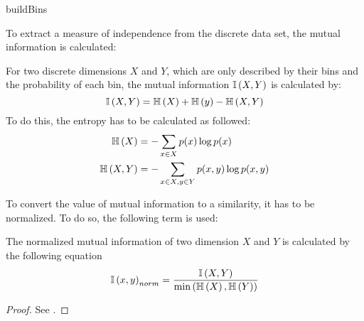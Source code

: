 \begin{algorithm}



	\caption{buildBins}
	\label{alg:buildBins}
\end{algorithm}

To extract a measure of independence from the discrete data set, the mutual information is calculated:

\begin{envdef}
	For two discrete dimensions $X$ and $Y$, which are only described by their bins and the probability of each bin, the mutual information $\mathbb{I}\left(X,Y\right)$ is calculated by:
	\begin{equation}
		\mathbb{I}\left(X,Y\right) = \mathbb{H}\left(X\right) + \mathbb{H}\left(y\right) - \mathbb{H}\left(X,Y\right)
	\end{equation}
	To do this, the entropy has to be calculated as followed:
	\begin{align}
		\mathbb{H}\left(X\right) &= - \sum_{x \in X} p(x) \log{p(x)}\\
		\mathbb{H}\left(X,Y\right) &= - \sum_{x \in X, y \in Y} p(x,y) \log{p(x,y)}
	\end{align}
\end{envdef}

To convert the value of mutual information to a similarity, it has to be normalized. To do so, the following term is used:

\begin{envtheo}
	The normalized mutual information of two dimension $X$ and $Y$ is calculated by the following equation
	\begin{equation}
		\mathbb{I}\left(x,y\right)_{norm} = \frac{\mathbb{I}\left(X,Y\right)}{\min{\left( \mathbb{H}\left(X\right), \mathbb{H}\left(Y\right) \right)}}
	\end{equation}
\end{envtheo}
\begin{proof}
	See \cite{mutual}.
\end{proof}

